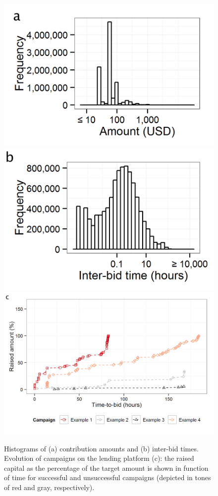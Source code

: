 \documentclass[sigconf]{acmart}
\begin{document}
\begin{figure}
    \centering
     \includegraphics[scale=.25]{samples/figs/lending-amount.png}
    \includegraphics[scale=.25]{samples/figs/lending-time.png}
    \includegraphics[scale=.5]{samples/figs/lending-examples.png}
    \caption{Histograms of (a) contribution amounts and (b) inter-bid times. Evolution of campaigns on the lending platform (c): the raised capital as the percentage of the target amount is shown in function of time for successful and unsuccessful campaigns (depicted in tones of red and gray, respectively).}
    \label{fig:trajectories}
    \vspace{-2em}
\end{figure}
\end{document}
